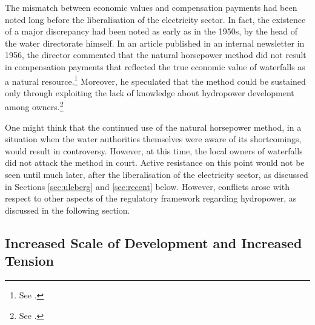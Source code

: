 The mismatch between economic values and compensation payments had been noted long before the liberalisation of the electricity sector. In fact, the existence of a major discrepancy had been noted as early as in the 1950s, by the head of the water directorate himself. In an article published in an internal newsletter in 1956, the director commented that the natural horsepower method did not result in compensation payments that reflected the true economic value of waterfalls as a natural resource.\footnote{See \cite{rogstad56}.} Moreover, he speculated that the method could be sustained only through exploiting the lack of knowledge about hydropower development among owners.\footnote{See \cite{rogstad56}.}

One might think that the continued use of the natural horsepower method, in a situation when the water authorities themselves were aware of its shortcomings, would result in controversy. However, at this time, the local owners of waterfalls did not attack the method in court. Active resistance on this point would not be seen until much later, after the liberalisation of the electricity sector, as discussed in Sections \ref{sec:uleberg} and \ref{sec:recent} below. However, conflicts arose with respect to other aspects of the regulatory framework regarding hydropower, as discussed in the following section.

\subsection{Increased Scale of Development and Increased Tension}\label{sec:5:4:2}

